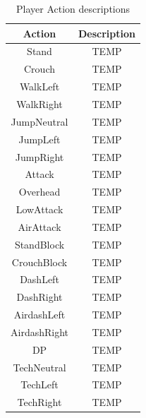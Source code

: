 \documentclass{article}
\begin{document}
\begin{table}[h]
	\centering
	\caption{Player Action descriptions}
	\begin{tabular}{| c | c |}
		\hline
		Action & Description \\
		\hline
		Stand & TEMP \\ 
		\hline
		Crouch & TEMP \\ 
		\hline
		WalkLeft & TEMP \\ 
		\hline
		WalkRight & TEMP \\
		\hline
		JumpNeutral & TEMP \\
		\hline
		JumpLeft & TEMP \\
		\hline
		JumpRight & TEMP \\
		\hline
		Attack & TEMP \\
		\hline
		Overhead & TEMP \\ 
		\hline
		LowAttack & TEMP \\ 
		\hline
		AirAttack & TEMP \\ 
		\hline
		StandBlock & TEMP \\ 
		\hline
		CrouchBlock & TEMP \\ 
		\hline
		DashLeft & TEMP \\ 
		\hline
		DashRight & TEMP \\ 
		\hline
		AirdashLeft & TEMP \\ 
		\hline
		AirdashRight & TEMP \\ 
		\hline
		DP & TEMP \\
		\hline
		TechNeutral & TEMP \\ 
		\hline
		TechLeft & TEMP \\ 
		\hline
		TechRight & TEMP \\
		\hline
	\end{tabular}
	\label{actions}
\end{table}

\printbibliography
\end{document}
